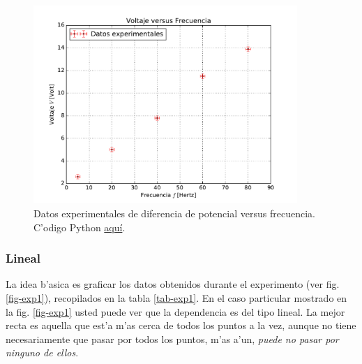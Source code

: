 \begin{figure}[h!]
\begin{center}
\includegraphics[width=10cm]{figs/fig-grafico-con-error.pdf}
\caption{Datos experimentales de diferencia de potencial versus frecuencia. C'odigo Python \href{https://github.com/gfrubi/Lab/blob/master/python/fig-grafico-con-error.py}{aqu\'i}.}
\end{center}
\label{fig-g1}
\end{figure}


\subsubsection{Lineal}
La idea b'asica es graficar los datos obtenidos durante el experimento (ver fig. \ref{fig-exp1}),  recopilados en la tabla \ref{tab-exp1}. En el caso particular mostrado en la fig. \ref{fig-exp1} usted puede ver que la dependencia es del tipo lineal. La mejor recta es aquella que est'a m'as cerca de todos los puntos a la vez, aunque no tiene necesariamente que pasar por todos los puntos, m'as a'un, \textit{puede no pasar por ninguno de ellos}.


